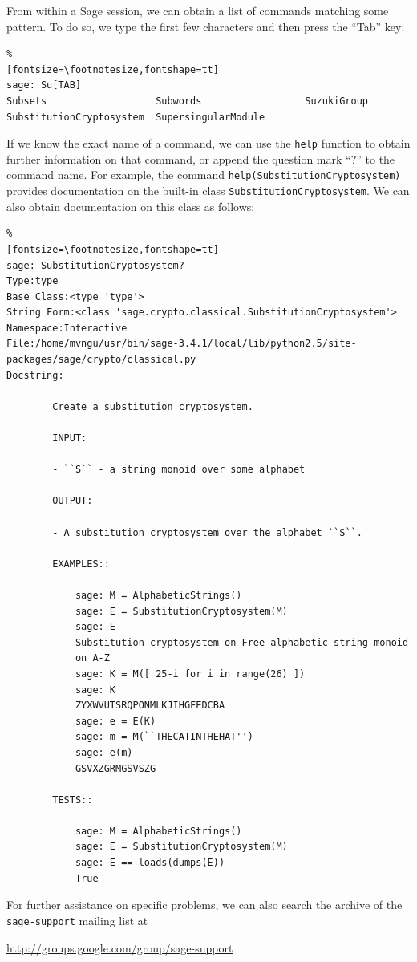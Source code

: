 From within a Sage session, we can obtain a list of commands matching
some pattern.  To do so, we type the first few characters and then
press the ``Tab'' key:
%
\begin{Verbatim}%
[fontsize=\footnotesize,fontshape=tt]
sage: Su[TAB]
Subsets                   Subwords                  SuzukiGroup
SubstitutionCryptosystem  SupersingularModule
\end{Verbatim}
%
If we know the exact name of a command, we can use the \texttt{help}
function to obtain further information on that command, or append the
question mark ``?'' to the command name.  For example,
the command \texttt{help(SubstitutionCryptosystem)} provides
documentation on the built-in class
\texttt{SubstitutionCryptosystem}. We can also obtain documentation on
this class as follows:
%
\begin{Verbatim}%
[fontsize=\footnotesize,fontshape=tt]
sage: SubstitutionCryptosystem?
Type:type
Base Class:<type 'type'>
String Form:<class 'sage.crypto.classical.SubstitutionCryptosystem'>
Namespace:Interactive
File:/home/mvngu/usr/bin/sage-3.4.1/local/lib/python2.5/site-packages/sage/crypto/classical.py
Docstring:

        Create a substitution cryptosystem.

        INPUT:

        - ``S`` - a string monoid over some alphabet

        OUTPUT:

        - A substitution cryptosystem over the alphabet ``S``.

        EXAMPLES::

            sage: M = AlphabeticStrings()
            sage: E = SubstitutionCryptosystem(M)
            sage: E
            Substitution cryptosystem on Free alphabetic string monoid
            on A-Z
            sage: K = M([ 25-i for i in range(26) ])
            sage: K
            ZYXWVUTSRQPONMLKJIHGFEDCBA
            sage: e = E(K)
            sage: m = M(``THECATINTHEHAT'')
            sage: e(m)
            GSVXZGRMGSVSZG

        TESTS::

            sage: M = AlphabeticStrings()
            sage: E = SubstitutionCryptosystem(M)
            sage: E == loads(dumps(E))
            True
\end{Verbatim}
%
For further assistance on specific problems, we can also
search the archive of the \texttt{sage-support} mailing list at
%
\begin{center}
  \url{http://groups.google.com/group/sage-support}
\end{center}
